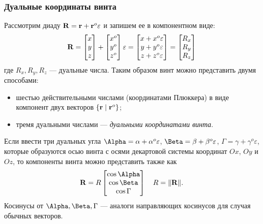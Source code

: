 \begin{frame}
  \frametitle{Дуальные координаты винта}
  Рассмотрим диаду $\vb{R} = \vb{r} + \vb{r}^{o}\varepsilon$ и запишем ее в компонентном виде:
  \begin{equation*}
    \vb{R} = 
    \begin{bmatrix}
      x\\y\\z
    \end{bmatrix}
    +
    \begin{bmatrix}
      x^o\\y^o\\z^o
    \end{bmatrix}
    \varepsilon
    =
    \begin{bmatrix}
      x + x^o\varepsilon\\
      y + y^o\varepsilon\\
      z + z^o\varepsilon
    \end{bmatrix}
    =
    \begin{bmatrix}
      R_x\\R_y\\R_z
    \end{bmatrix}
  \end{equation*}
  где $R_x, R_y, R_z$ — дуальные числа. Таким образом винт можно представить двумя способами:
  \begin{itemize}
    \item шестью действительными числами (координатами Плюккера) в виде компонент двух векторов $\{\vb{r} \mid \vb{r}^o\}$;
    \item тремя дуальными числами — \emph{дуальными координатами винта}.
  \end{itemize}
  Если ввести три дуальных угла $\Alpha = \alpha + \alpha^o\varepsilon$, $\Beta = \beta + \beta^o\varepsilon$, $\Gamma = \gamma + \gamma^o\varepsilon$, которые образуются осью винта с осями декартовой системы координат $Ox$, $Oy$ и $Oz$, то компоненты винта можно представить также как
  \begin{equation*}
    \vb{R} = 
    R
    \begin{bmatrix}
      \cos\Alpha\\ 
      \cos\Beta\\ 
      \cos\Gamma\\ 
    \end{bmatrix}
    \quad
    R = \norm{\vb{R}}.
  \end{equation*}
  Косинусы от $\Alpha, \Beta, \Gamma$ — аналоги направляющих косинусов для случая обычных векторов.
\end{frame}

